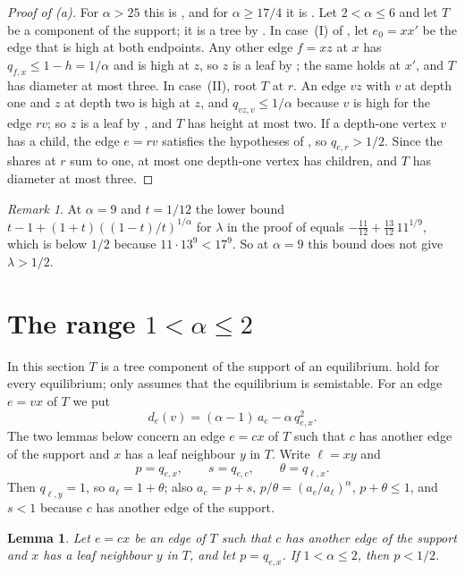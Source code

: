 \documentclass[11pt]{article}
\newtheorem{lemma}[theorem]{Lemma}
\theoremstyle{definition}
\theoremstyle{remark}
\newtheorem{remark}[theorem]{Remark}
\begin{document}
\begin{proof}[Proof of (a)]
For $\alpha>25$ this is \cite[Theorem~2(a)]{HK}, and for $\alpha\ge17/4$ it is \cite[Section~4]{Kr}. Let $2<\alpha\le 6$ and let $T$ be a component of the
support; it is a tree by . In case~(I) of , let $e_0=xx'$ be the edge that is high at both endpoints. Any
other edge $f=xz$ at $x$ has $q_{f,x}\le 1-h=1/\alpha$ and is high at $z$, so $z$ is a leaf by ; the
same holds at $x'$, and $T$ has diameter at most three. In case~(II), root $T$ at $r$. An edge $vz$ with $v$ at depth
one and $z$ at depth two is high at $z$, and $q_{vz,v}\le 1/\alpha$ because $v$ is high for the edge $rv$; so $z$ is a
leaf by , and $T$ has height at most two. If a depth-one vertex $v$ has a child, the edge $e=rv$
satisfies the hypotheses of , so $q_{e,r}>1/2$. Since the shares at $r$ sum to one, at most one
depth-one vertex has children, and $T$ has diameter at most three.
\end{proof}

\begin{remark}\label{rem:nine}
At $\alpha=9$ and $t=1/12$ the lower bound $t-1+(1+t)((1-t)/t)^{1/\alpha}$ for $\lambda$ in the proof of
 equals $-\frac{11}{12}+\frac{13}{12}\,11^{1/9}$, which is below $1/2$ because $11\cdot 13^9<17^9$.
So at $\alpha=9$ this bound does not give $\lambda>1/2$.
\end{remark}

\section{\texorpdfstring{The range $1<\alpha\le 2$}{The range 1 < alpha <= 2}}\label{sec:small}

In this section $T$ is a tree component of the support of an equilibrium. 
hold for every equilibrium; only  assumes that the equilibrium is semistable. For an edge $e=vx$ of
$T$ we put
\[
  d_e(v)=(\alpha-1)\,a_e-\alpha\,q_{e,x}^2 .
\]
The two lemmas below concern an edge $e=cx$ of $T$ such that $c$ has another edge of the support and $x$ has a leaf
neighbour $y$ in $T$. Write $\ell=xy$ and
\[
  p=q_{e,x},\qquad s=q_{e,c},\qquad \theta=q_{\ell,x}.
\]
Then $q_{\ell,y}=1$, so $a_{\ell}=1+\theta$; also $a_e=p+s$, $p/\theta=(a_e/a_{\ell})^\alpha$, $p+\theta\le 1$, and $s<1$ because $c$ has
another edge of the support.

\begin{lemma}\label{lem:B}
Let $e=cx$ be an edge of $T$ such that $c$ has another edge of the support and $x$ has a leaf neighbour $y$ in $T$, and
let $p=q_{e,x}$. If $1<\alpha\le 2$, then $p<1/2$.
\end{lemma}
\end{document}
